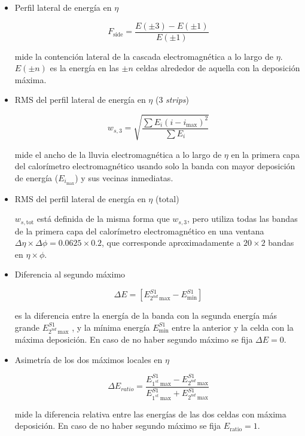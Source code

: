 \begin{itemize}
	\item  Perfil lateral de energía en $\eta$

		\begin{equation}
		F_{\text{side}}=\frac{E(\pm 3)-E(\pm 1)}{E(\pm 1)}
		\end{equation}

		mide la contención lateral de la cascada electromagnética a lo largo de $\eta$. $E(\pm n)$ es la energía en las $\pm n$ celdas alrededor de aquella con la deposición máxima.

	\item  RMS del perfil lateral de energía en $\eta$ (3 \textit{strips})

		\begin{equation}
		w_{s,3}=\sqrt{\frac{\sum E_{i}(i-i_{\text{max}})^{2}}{\sum E_{i}}}
		\end{equation}

		mide el ancho de la lluvia electromagnética a lo largo de $\eta$ en la primera capa del calorímetro electromagnético usando solo la banda con mayor deposición de energía ($E_{i_{\text{max}}}$) y sus vecinas inmediatas.

	\item  RMS del perfil lateral de energía en $\eta$ (total)

		$w_{s,\text{tot}}$ está definida de la misma forma que $w_{s,3}$, pero utiliza todas las bandas de la primera capa del calorímetro electromagnético en una ventana $\Delta\eta\times\Delta\phi = 0.0625 \times 0.2$, que corresponde aproximadamente a $20\times 2$ bandas en $\eta \times \phi$.

	\item  Diferencia al segundo máximo

		\begin{equation}
		\Delta E=[E_{2^{nd} \:\text{max}}^{S1} - E_{\text{min}}^{S1}]
		\end{equation}

		es la diferencia entre la energía de la banda con la segunda energía más grande $E_{2^{nd} \:\text{max}}^{S1}$ , y la mínima energía $E_{\text{min}}^{S1}$ entre la anterior y la celda con la máxima deposición. En caso de no haber segundo máximo se fija $\Delta E = 0$.

	\item  Asimetría de los dos máximos locales en $\eta$

		\begin{equation}
		\Delta E_{ratio}=\frac{E_{1^{st} \:\text{max}}^{S1} - E_{2^{nd} \:\text{max}}^{S1}}{E_{1^{st} \:\text{max}}^{S1} + E_{2^{nd} \:\text{max}}^{S1}}
		\end{equation}
 
 		mide la diferencia relativa entre las energías de las dos celdas con máxima deposición. En caso de no haber segundo máximo se fija $E_{\text{ratio}} = 1$.


\end{itemize}

